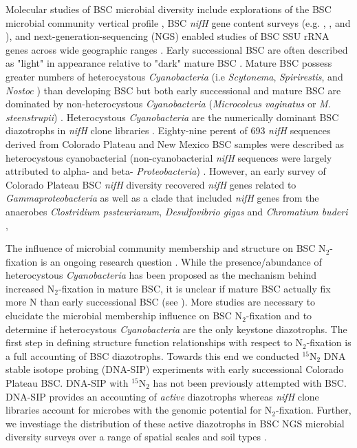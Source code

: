 Molecular studies of BSC microbial diversity include explorations of the BSC
microbial community vertical profile \citep{Garcia_Pichel_2003}, BSC
\textit{nifH} gene content surveys (e.g. \citet{14766579}, \citet{Yeager_2012},
\citet{Yeager} and \citet{Steppe_1996}), and next-generation-sequencing (NGS)
enabled studies of BSC SSU rRNA genes across wide geographic ranges
\citep{Garcia_Pichel_2013, Steven_2013}. Early successional  BSC are often
described as "light" in appearance relative to "dark" mature BSC
\citep{Belnap_2002, 14766579}. Mature BSC possess greater numbers of
heterocystous \textit{Cyanobacteria} (i.e \textit{Scytonema},
\textit{Spirirestis}, and \textit{Nostoc} \citep{Yeager, Yeager_2012}) than
developing BSC but both early successional and mature BSC are dominated by
non-heterocystous \textit{Cyanobacteria} (\textit{Microcoleus vaginatus} or
\textit{M. steenstrupii}) \citep{14766579, Garcia_Pichel_2013}.  Heterocystous
\textit{Cyanobacteria} are the numerically dominant BSC diazotrophs in
\textit{nifH} clone libraries \citep{Yeager, 14766579, Yeager_2012}.
Eighty-nine perent of 693 \textit{nifH} sequences derived from Colorado Plateau and
New Mexico BSC samples were described as heterocystous cyanobacterial
(non-cyanobacterial \textit{nifH} sequences were largely attributed to alpha-
and beta- \textit{Proteobacteria}) \citep{Yeager}. However, an early survey of
Colorado Plateau BSC \textit{nifH} diversity recovered \textit{nifH} genes
related to \textit{Gammaproteobacteria} as well as a clade that included
\textit{nifH} genes from the anaerobes \textit{Clostridium pssteurianum},
\textit{Desulfovibrio gigas} and \textit{Chromatium buderi} \citep{Steppe_1996},

The influence of microbial community membership and structure on BSC
N$_{2}$-fixation is an ongoing research question \citep{Belnap28062013}. While
the presence/abundance of heterocystous \textit{Cyanobacteria} has been
proposed as the mechanism behind increased N$_{2}$-fixation in mature BSC, it
is unclear if mature BSC actually fix more N than early successional BSC (see
\citet{15643930}). More studies are necessary to elucidate the microbial
membership influence on BSC N$_{2}$-fixation and to determine if heterocystous
\textit{Cyanobacteria} are the only keystone diazotrophs. The first step in
defining structure function relationships with respect to N$_{2}$-fixation is a
full accounting of BSC diazotrophs. Towards this end we conducted
$^{15}$N$_{2}$ DNA stable isotope probing (DNA-SIP) experiments with early
successional Colorado Plateau BSC.  DNA-SIP with $^{15}$N$_{2}$ has not been
previously attempted with BSC. DNA-SIP provides an accounting of \textit{active}
diazotrophs whereas \textit{nifH} clone libraries account for microbes with the
genomic potential for N$_{2}$-fixation.  Further, we investiage the
distribution of these active diazotrophs in BSC NGS microbial diversity surveys
over a range of spatial scales and soil types \citep{Garcia_Pichel_2013,
Steven_2013}. 
